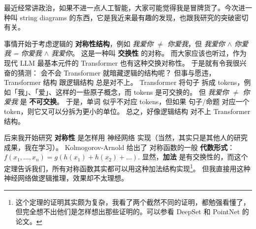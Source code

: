 \begin{preview}


\cc{
\title{\vspace{-0.5cm} \bfseries\color{blue}{\Huge 「绳子戏法」 \normalsize -- 人工智能的数学}}
}{
\title{\vspace{-0.5cm} \bfseries\color{blue}{\Huge String Diagrams}}
}

\author{\small YKY [\today]} %
\date{\vspace{-0.5cm}} %

\maketitle

\setcounter{section}{-1}
\setcounter{mypage}{0}


\begin{minipage}{\textwidth}
\setlength{\parskip}{0.4\baselineskip}

最近经常讲政治，如果不进一点人工智能，大家可能觉得我是冒牌货了。今次进一种叫 string diagrams 的东西，它是我近来最有趣的发现，也跟我研究的突破密切有关。

事情开始于考虑逻辑的 \textbf{对称性结构}，例如 \textit{我爱你 $\neq$ 你爱我}，但 \textit{我爱你 $\wedge$ 你爱我 = 你爱我 $\wedge$ 我爱你}。 这是一种叫 \textbf{交换性} 的对称。 而大家应该也听过，作为现代 LLM 最基本元件的 Transformer 也有这种交换对称性。 于是就有令我很兴奋的猜测： 会不会 Transformer 就暗藏逻辑的结构呢？ 但事与愿违，Transformer 结构 跟逻辑结构 总是对不上。 Transformer 将句子 拆成 tokens，例如「我」、「爱」、这样的一些原子概念，而 tokens 是可交换的。 但 \textit{我爱你 $\neq$ 你爱我} 是 \textbf{不可交换}。 于是，单词 似乎不对应 tokens，但如果 句子/命题 对应一个 token，则它又可以分拆为更小的单位。 总之，好像逻辑结构 对不上 Transformer 结构。

后来我开始研究 \textbf{对称性} 是怎样用 神经网络 实现（当然，其实只是其他人的研究成果，我在学习）。 Kolmogorov-Arnold 给出了 对称函数的一般 \textbf{代数形式}： $f(x_1, ..., x_n) = g( h(x_1) + h(x_2) + ...)$.  显然，\textbf{加法} 是有交换性的，而这个定理告诉我们，所有对称函数其实都可以用这种加法结构实现\footnote{这个定理的证明其实颇为复杂，我看了两个截然不同的证明，都勉强看懂了，但完全想不出他们是怎样想出那些证明的。可以参看 DeepSet 和 PointNet 的论文。}。 但我直接用这种神经网络做逻辑推理，效果却不太理想。


\end{minipage}
\end{preview}
